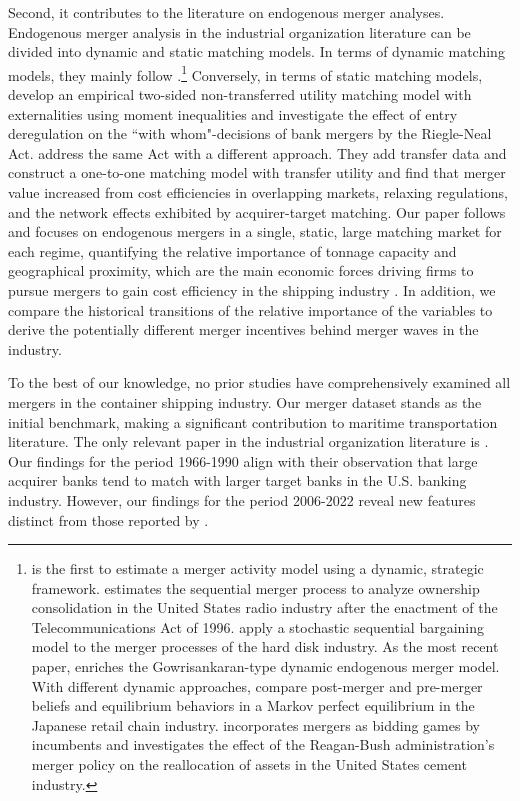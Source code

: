 \documentclass[10pt]{article}
\begin{document}
Second, it contributes to the literature on endogenous merger analyses. 
Endogenous merger analysis in the industrial organization literature can be divided into dynamic and static matching models. 
In terms of dynamic matching models, they mainly follow \cite{gowrisankaran1999dynamic}.\footnote{\cite{stahl2011dynamic} is the first to estimate a merger activity model using a dynamic, strategic framework. \cite{jeziorski2014effects} estimates the sequential merger process to analyze ownership consolidation in the United States radio industry after the enactment of the Telecommunications Act of 1996. \cite{igami2019mergers} apply a stochastic sequential bargaining model to the merger processes of the hard disk industry. As the most recent paper, \cite{hollenbeck2020horizontal} enriches the Gowrisankaran-type dynamic endogenous merger model. With different dynamic approaches, \cite{nishida2015better} compare post-merger and pre-merger beliefs and equilibrium behaviors in a Markov perfect equilibrium in the Japanese retail chain industry. \cite{perez2015building} incorporates mergers as bidding games by incumbents and investigates the effect of the Reagan-Bush administration's merger policy on the reallocation of assets in the United States cement industry.} 
Conversely, in terms of static matching models, \cite{uetake2019entry} develop an empirical two-sided non-transferred utility matching model with externalities using moment inequalities and investigate the effect of entry deregulation on the ``with whom"-decisions of bank mergers by the Riegle-Neal Act. 
\cite{akkus2015ms} address the same Act with a different approach. 
They add transfer data and construct a one-to-one matching model with transfer utility and find that merger value increased from cost efficiencies in overlapping markets, relaxing regulations, and the network effects exhibited by acquirer-target matching. 
Our paper follows \cite{akkus2015ms} and focuses on endogenous mergers in a single, static, large matching market for each regime, quantifying the relative importance of tonnage capacity and geographical proximity, which are the main economic forces driving firms to pursue mergers to gain cost efficiency in the shipping industry \citep{notteboom2004container}. 
In addition, we compare the historical transitions of the relative importance of the variables to derive the potentially different merger incentives behind merger waves in the industry.

To the best of our knowledge, no prior studies have comprehensively examined all mergers in the container shipping industry. Our merger dataset stands as the initial benchmark, making a significant contribution to maritime transportation literature. The only relevant paper in the industrial organization literature is \cite{akkus2015ms}. Our findings for the period 1966-1990 align with their observation that large acquirer banks tend to match with larger target banks in the U.S. banking industry. However, our findings for the period 2006-2022 reveal new features distinct from those reported by \cite{akkus2015ms}.
\end{document}
